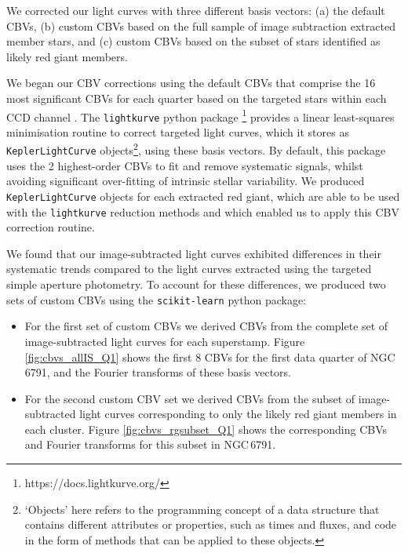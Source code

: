 We corrected our light curves with three different basis vectors: (a) the default \Kepler{} CBVs, (b) custom CBVs based on the full sample of image subtraction extracted member stars, and (c) custom CBVs based on the subset of stars identified as likely red giant members.

We began our CBV corrections using the default \Kepler{} CBVs that comprise the 16 most significant CBVs for each quarter based on the targeted stars within each CCD channel \citep{thompson_kepler_2016}. The \texttt{lightkurve} python package \footnote{https://docs.lightkurve.org/} provides a linear least-squares minimisation routine to correct targeted light curves, which it stores as \texttt{KeplerLightCurve} objects\footnote[2]{`Objects' here refers to the programming concept of a data structure that contains different attributes or properties, such as times and fluxes, and code in the form of methods that can be applied to these objects.}, using these basis vectors. By default, this package uses the 2 highest-order CBVs to fit and remove systematic signals, whilst avoiding significant over-fitting of intrinsic stellar variability. We produced \texttt{KeplerLightCurve} objects for each extracted red giant, which are able to be used with the \texttt{lightkurve} reduction methods and which enabled us to apply this CBV correction routine.

We found that our image-subtracted light curves exhibited differences in their systematic trends compared to the light curves extracted using the targeted simple aperture photometry. To account for these differences, we produced two sets of custom CBVs using the \texttt{scikit-learn} python package:
\begin{itemize}
    \item For the first set of custom CBVs we derived CBVs from the complete set of image-subtracted light curves for each superstamp. Figure \ref{fig:cbvs_allIS_Q1} shows the first 8 CBVs for the first data quarter of NGC\,6791, and the Fourier transforms of these basis vectors.
    
    \item For the second custom CBV set we derived CBVs from the subset of image-subtracted light curves corresponding to only the likely red giant members in each cluster. Figure \ref{fig:cbvs_rgsubset_Q1} shows the corresponding CBVs and Fourier transforms for this subset in NGC\,6791.
\end{itemize}

